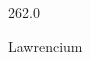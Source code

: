 \documentclass[12pt]{article}
\begin{document}
\hfill{}
\vfill
\begin{center}
  {\fontsize{50}{60}
  }

  \vspace{1em}

  262.0

Lawrencium
\end{center}
\vfill
\end{document}
